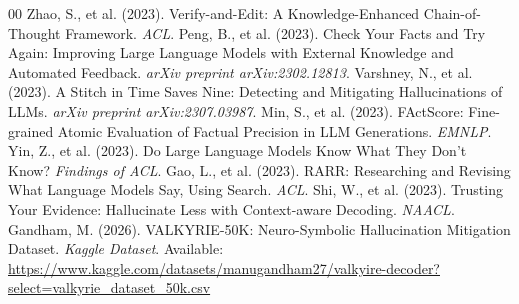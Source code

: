 \documentclass[11pt,a4paper]{article}
\begin{document}
\begin{thebibliography}{00}
 Zhao, S., et al. (2023). Verify-and-Edit: A Knowledge-Enhanced Chain-of-Thought Framework. \textit{ACL}.
 Peng, B., et al. (2023). Check Your Facts and Try Again: Improving Large Language Models with External Knowledge and Automated Feedback. \textit{arXiv preprint arXiv:2302.12813}.
 Varshney, N., et al. (2023). A Stitch in Time Saves Nine: Detecting and Mitigating Hallucinations of LLMs. \textit{arXiv preprint arXiv:2307.03987}.
 Min, S., et al. (2023). FActScore: Fine-grained Atomic Evaluation of Factual Precision in LLM Generations. \textit{EMNLP}.
 Yin, Z., et al. (2023). Do Large Language Models Know What They Don't Know? \textit{Findings of ACL}.
 Gao, L., et al. (2023). RARR: Researching and Revising What Language Models Say, Using Search. \textit{ACL}.
 Shi, W., et al. (2023). Trusting Your Evidence: Hallucinate Less with Context-aware Decoding. \textit{NAACL}.
 Gandham, M. (2026). VALKYRIE-50K: Neuro-Symbolic Hallucination Mitigation Dataset. \textit{Kaggle Dataset}. Available: \url{https://www.kaggle.com/datasets/manugandham27/valkyire-decoder?select=valkyrie_dataset_50k.csv}
\end{thebibliography}
\end{document}
